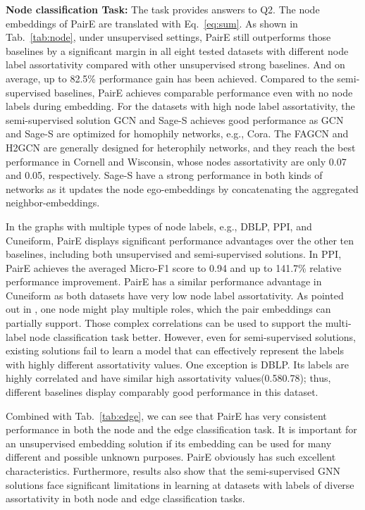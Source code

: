 \documentclass[10pt,journal,compsoc]{IEEEtran}
\begin{document}
\noindent\textbf{Node classification Task:} The task provides answers to Q2. The node embeddings of PairE are translated with Eq.~\ref{eq:sum}. As shown in Tab.~\ref{tab:node}, under unsupervised settings, PairE still outperforms those baselines by a significant margin in all eight tested datasets with different node label assortativity compared with other unsupervised strong baselines. And on average, up to 82.5\% performance gain has been achieved. Compared to the semi-supervised baselines, PairE achieves comparable performance even with no node labels during embedding. 
For the datasets with high node label assortativity, the semi-supervised solution GCN and Sage-S achieves good performance as GCN and Sage-S are optimized for homophily networks, e.g., Cora. The FAGCN and H2GCN are generally designed for heterophily networks, and they reach the best performance in Cornell and Wisconsin, whose nodes assortativity are only 0.07 and 0.05, respectively. Sage-S have a strong performance in both kinds of networks as it updates the node ego-embeddings by concatenating the aggregated neighbor-embeddings.


In the graphs with multiple types of node labels, e.g., DBLP, PPI, and Cuneiform, PairE displays significant performance advantages over the other ten baselines, including both unsupervised and semi-supervised solutions. In PPI, PairE achieves the averaged Micro-F1 score to 0.94 and up to 141.7\% relative performance improvement. PairE has a similar performance advantage in Cuneiform as both datasets have very low node label assortativity. As pointed out in \cite{Epasto19}, one node might play multiple roles, which the pair embeddings can partially support. Those complex correlations can be used to support the multi-label node classification task better. However, even for semi-supervised solutions, existing solutions fail to learn a model that can effectively represent the labels with highly different assortativity values. One exception is DBLP. Its labels are highly correlated and have similar high assortativity values(0.580.78); thus, different baselines display comparably good performance in this dataset. 

Combined with Tab.~\ref{tab:edge}, we can see that PairE has very consistent performance in both the node and the edge classification task. It is important for an unsupervised embedding solution if its embedding can be used for many different and possible unknown purposes. PairE obviously has such excellent characteristics. Furthermore, results also show that the semi-supervised GNN solutions face significant limitations in learning at datasets with labels of diverse assortativity in both node and edge classification tasks.
\end{document}
